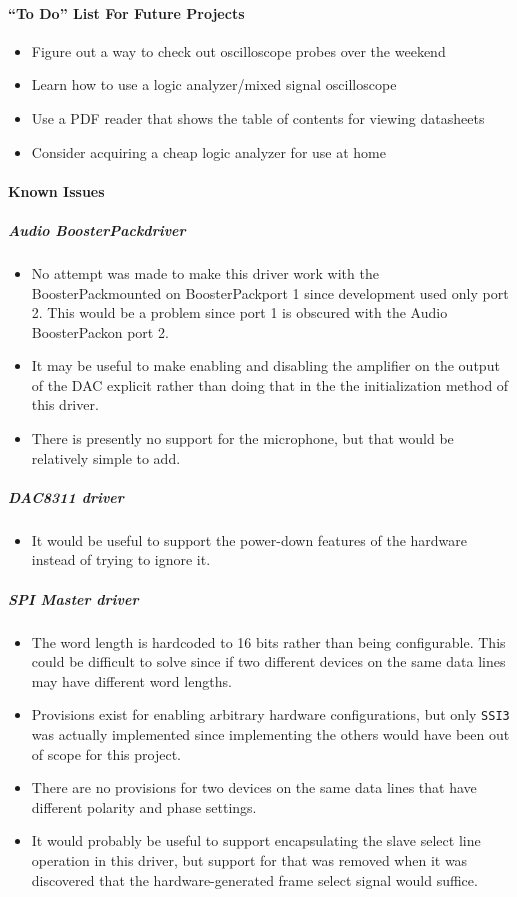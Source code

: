 \documentclass[titlepage]{article}
\begin{document}
\paragraph{``To Do'' List For Future Projects}
\begin{itemize}
    \item Figure out a way to check out oscilloscope probes over the weekend
    \item Learn how to use a logic analyzer/mixed signal oscilloscope
    \item Use a PDF reader that shows the table of contents for viewing datasheets
    \item Consider acquiring a cheap logic analyzer for use at home
\end{itemize}
\paragraph{Known Issues}
\subparagraph{Audio BoosterPack\textregistered\space driver}
\begin{itemize}
    \item No attempt was made to make this driver work with 
    the BoosterPack\textregistered\space mounted on BoosterPack\textregistered\space port 1 since development used only port 2.
    This would be a problem since port 1 is obscured with the Audio BoosterPack\textregistered\space on port 2.
    \item It may be useful to make enabling and disabling the amplifier on the output of the DAC explicit rather than doing that in the 
    the initialization method of this driver.
    \item There is presently no support for the microphone, but that would be relatively simple to add.
\end{itemize}
\subparagraph{DAC8311 driver}
\begin{itemize}
    \item It would be useful to support the power-down features of the hardware instead of trying to ignore it.
\end{itemize}
\subparagraph{SPI Master driver}
\begin{itemize}
    \item The word length is hardcoded to 16 bits rather than being configurable. This could be difficult to solve since if two different 
    devices on the same data lines may have different word lengths.
    \item Provisions exist for enabling arbitrary hardware configurations, but only \texttt{SSI3} was actually implemented 
    since implementing the others would have been out of scope for this project.
    \item There are no provisions for two devices on the same data lines that have different polarity and phase settings.
    \item It would probably be useful to support encapsulating the slave select line operation in this driver, but support for 
    that was removed when it was discovered that the hardware-generated frame select signal would suffice.
\end{itemize}
\pagebreak
\end{document}
